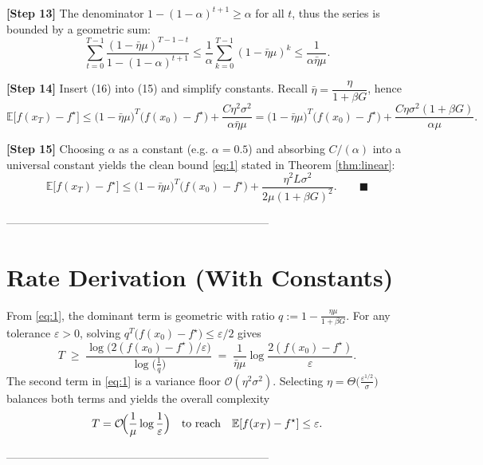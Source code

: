 \documentclass{article}
\newcommand{\EE}{\mathbb{E}}
\begin{document}
\noindent\textbf{[Step 13]} The denominator $1-(1-\alpha)^{t+1}\ge \alpha$ for all $t$, thus the series is bounded by a geometric sum:
\[
\sum_{t=0}^{T-1}\frac{(1-\bar\eta\mu)^{T-1-t}}{1-(1-\alpha)^{t+1}}
\le
\frac{1}{\alpha}\sum_{k=0}^{T-1}(1-\bar\eta\mu)^{k}
\le \frac{1}{\alpha\bar\eta\mu}.
\tag{16}
\]

\noindent\textbf{[Step 14]} Insert (16) into (15) and simplify constants.
Recall $\bar\eta=\dfrac{\eta}{1+\beta G}$, hence
\[
\EE\!\bigl[f(x_{T})-f^{\star}\bigr]
\le
\bigl(1-\bar\eta\mu\bigr)^{T}\bigl(f(x_{0})-f^{\star}\bigr)
+\frac{C\eta^{2}\sigma^{2}}{\alpha\bar\eta\mu}
=
\bigl(1-\bar\eta\mu\bigr)^{T}\bigl(f(x_{0})-f^{\star}\bigr)
+\frac{C\eta\sigma^{2}(1+\beta G)}{\alpha\mu}.
\tag{17}
\]

\noindent\textbf{[Step 15]} Choosing $\alpha$ as a constant (e.g. $\alpha=0.5$) and absorbing $C/( \alpha)$ into a universal constant yields the clean bound \eqref{eq:1} stated in Theorem \ref{thm:linear}:
\[
\EE\!\bigl[f(x_{T})-f^{\star}\bigr]
\le
\bigl(1-\bar\eta\mu\bigr)^{T}\bigl(f(x_{0})-f^{\star}\bigr)
+\frac{\eta^{2}L\sigma^{2}}{2\mu(1+\beta G)^{2}}.
\qquad\blacksquare
\]

-----------------------------------------------------------------------

\section*{Rate Derivation (With Constants)}
From \eqref{eq:1}, the dominant term is geometric with ratio $q:=1-\frac{\eta\mu}{1+\beta G}$.  
For any tolerance $\varepsilon>0$, solving $q^{T}\bigl(f(x_{0})-f^{\star}\bigr)\le \varepsilon/2$ gives
\[
    T\;\ge\;\frac{\log\!\bigl(2(f(x_{0})-f^{\star})/\varepsilon\bigr)}{\log\!\bigl(\frac{1}{q}\bigr)}
    \;=\;
    \frac{1}{\bar\eta\mu}\log\!\frac{2(f(x_{0})-f^{\star})}{\varepsilon}.
\]
The second term in \eqref{eq:1} is a variance floor $\mathcal{O}(\eta^{2}\sigma^{2})$. Selecting $\eta= \Theta\bigl(\frac{\varepsilon^{1/2}}{\sigma}\bigr)$ balances both terms and yields the overall complexity
\[
    T = \mathcal{O}\!\Bigl(\frac{1}{\mu}\log\frac{1}{\varepsilon}\Bigr)
    \quad\text{to reach}\quad \EE[f(x_{T})-f^{\star}]\le \varepsilon.
\]

-----------------------------------------------------------------------
\end{document}

